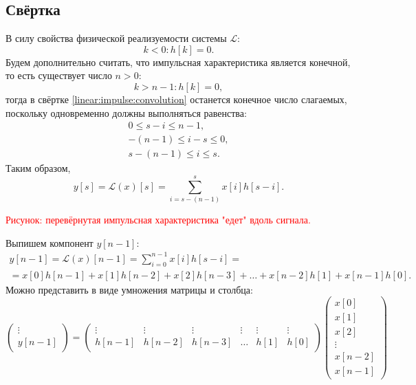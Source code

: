 \subsection{Свёртка}

В силу свойства физической реализуемости системы $\mathcal{L}$:
\[
    k < 0 : h[k] = 0 .
\]
Будем дополнительно считать, что импульсная характеристика является конечной, то есть существует число $n>0$:
\[
    k > n-1 : h[k] = 0 ,
\]
тогда в свёртке \eqref{linear:impulse:convolution} останется конечное число слагаемых, поскольку одновременно должны выполняться равенства:
\begin{gather*}
    0 \le s - i \le n-1 , \\
    -(n - 1) \le i - s \le 0 , \\
    s - (n - 1) \le i \le s .
\end{gather*}
Таким образом,
\[
    y[s]
    = \mathcal{L}(x)[s]
    = \sum_{i=s-(n-1)}^s x[i] h[s-i] .
\]

\textcolor{red}{Рисунок: перевёрнутая импульсная характеристика "едет"{} вдоль сигнала.}

Выпишем компонент $y[n-1]$:
\begin{multline*}
    y[n-1]
    = \mathcal{L}(x)[n-1]
    = \sum_{i=0}^{n-1} x[i] h[s-i] = \\
    = x[0] h[n-1] + x[1] h[n-2] + x[2] h[n-3] + \dots + x[n-2] h[1] + x[n-1] h[0] .
\end{multline*}
Можно представить в виде умножения матрицы и столбца:
\[
    \begin{pmatrix}
        \vdots \\
        y[n-1]
    \end{pmatrix}
    = \begin{pmatrix}
        \vdots & \vdots & \vdots & \vdots & \vdots & \vdots \\
        h[n-1] & h[n-2] & h[n-3] & \dots  & h[1]   & h[0]
    \end{pmatrix}
    \begin{pmatrix}
        x[0]   \\
        x[1]   \\
        x[2]   \\
        \vdots \\
        x[n-2] \\
        x[n-1]
    \end{pmatrix}
\]

